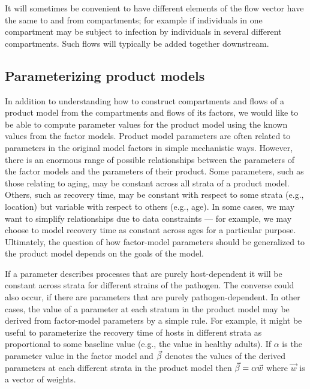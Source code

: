 It will sometimes be convenient to have different elements of the flow vector have the same to and from compartments; for example if individuals in one compartment may be subject to infection by individuals in several different compartments. Such flows will typically be added together downstream.



\subsection{Parameterizing product models}

In addition to understanding how to construct compartments and flows of a product model from the compartments and flows of its factors, we would like to be able to compute parameter values for the product model using the known values from the factor models.
Product model parameters are often related to parameters in the original model factors in simple mechanistic ways. However, there is an enormous range of possible relationships between the parameters of the factor models and the parameters of their product.
Some parameters, such as those relating to aging, may be constant across all strata of a product model. Others, such as recovery time, may be constant with respect to some strata (e.g., location) but variable with respect to others (e.g., age). In some cases, we may want to simplify relationships due to data constraints --- for example, we may choose to model recovery time as constant across ages for a particular purpose. Ultimately, the question of how factor-model parameters should be generalized to the product model depends on the goals of the model. 

If a parameter describes processes that are purely host-dependent it will be constant across strata for different strains of the pathogen. The converse could also occur, if there are parameters that are purely pathogen-dependent. 
In other cases, the value of a parameter at each stratum in the product model may be derived from factor-model parameters by a simple rule. For example, it might be useful to parameterize the recovery time of hosts in different strata as proportional to some baseline value (e.g., the value in healthy adults). If $\alpha$ is the parameter value in the factor model and $\vec{\beta}$ denotes the values of the derived parameters at each different strata in the product model then $\vec{\beta} = \alpha\vec{w}$ where $\vec{w}$ is a vector of weights.

